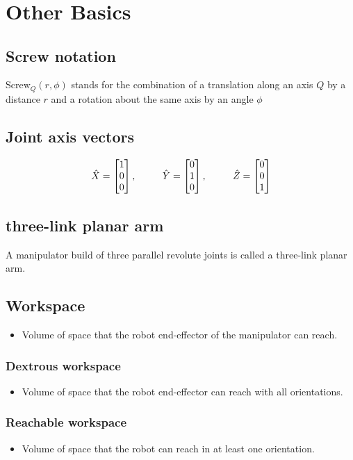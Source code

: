 \documentclass[10pt,a4paper]{article}
\newcommand{\tab}[1][1]{\hspace*{#1cm}}
\newcommand{\vect}[1]{\ensuremath{\begin{bmatrix}#1\end{bmatrix}}}
\begin{document}
~\\\\\\
\section{Other Basics}
\subsection{Screw notation}
$\textrm{Screw}_Q(r, \phi)$ stands for the combination of a translation along an axis $Q$ by a distance $r$ and a rotation about the same axis by an angle $\phi$

\subsection{Joint axis vectors}
$$
	\hat{X} = \vect{1 \\ 0 \\ 0}
\text{,\tab}
	\hat{Y} = \vect{0 \\ 1 \\ 0}
\text{,\tab}
	\hat{Z} = \vect{0 \\ 0 \\ 1}
$$

\subsection{three-link planar arm}
A manipulator build of three parallel revolute joints is called a three-link planar arm.

\subsection{Workspace}
\begin{itemize}
	\item Volume of space that the robot end-effector of the manipulator can reach.
\end{itemize}

\subsubsection{Dextrous workspace}
\begin{itemize}
	\item Volume of space that the robot end-effector can reach with all orientations.
\end{itemize}

\subsubsection{Reachable workspace}
\begin{itemize}
	\item Volume of space that the robot can reach in at least one orientation.
\end{itemize}
\end{document}
